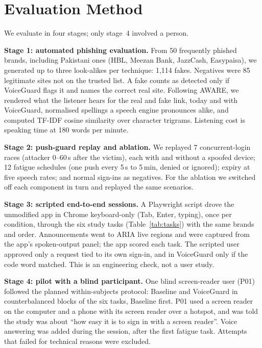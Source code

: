 \documentclass[conference]{IEEEtran}
\begin{document}
\section{Evaluation Method}

We evaluate in four stages; only stage~4 involved a person.

\textbf{Stage 1: automated phishing evaluation.} From 50 frequently phished brands, including Pakistani ones (HBL, Meezan Bank, JazzCash, Easypaisa), we generated up to three look-alikes per technique: 1,114 fakes. Negatives were 85 legitimate sites not on the trusted list. A fake counts as detected only if VoiceGuard flags it and names the correct real site. Following AWARE, we rendered what the listener hears for the real and fake link, today and with VoiceGuard, normalised spellings a speech engine pronounces alike, and computed TF-IDF cosine similarity over character trigrams. Listening cost is speaking time at 180 words per minute.

\textbf{Stage 2: push-guard replay and ablation.} We replayed 7 concurrent-login races (attacker 0--60\,s after the victim), each with and without a spoofed device; 12 fatigue schedules (one push every 5\,s to 5\,min, denied or ignored); expiry at five speech rates; and normal sign-ins as negatives. For the ablation we switched off each component in turn and replayed the same scenarios.

\textbf{Stage 3: scripted end-to-end sessions.} A Playwright script drove the unmodified app in Chrome keyboard-only (Tab, Enter, typing), once per condition, through the six study tasks (Table~\ref{tab:tasks}) with the same brands and order. Announcements went to ARIA live regions and were captured from the app's spoken-output panel; the app scored each task. The scripted user approved only a request tied to its own sign-in, and in VoiceGuard only if the code word matched. This is an engineering check, not a user study.

\textbf{Stage 4: pilot with a blind participant.} One blind screen-reader user (P01) followed the planned within-subjects protocol: Baseline and VoiceGuard in counterbalanced blocks of the six tasks, Baseline first. P01 used a screen reader on the computer and a phone with its screen reader over a hotspot, and was told the study was about ``how easy it is to sign in with a screen reader''. Voice answering was added during the session, after the first fatigue task. Attempts that failed for technical reasons were excluded.
\end{document}
